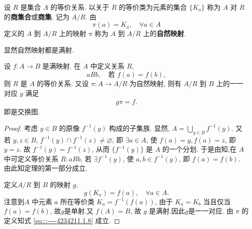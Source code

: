 \documentclass[../../main.tex]{subfiles}%
\begin{document}
\begin{definition}[商集和自然映射]
设 \( R \) 是集合 \( A \) 的等价关系. 以关于 \( R \) 的等价类为元素的集合 \( \{ K_a \} \) 称为 \( A \) 对 \( R \) 的\textbf{商集合}或\textbf{商集}. 记为 \( A/R \). 由
\[
\pi(a) = K_a,\quad \forall a \in A 
\]
定义的 \( A \) 到 \( A/R \) 上的映射 \( \pi \) 称为 \( A \) 到 \( A/R \) 上的\textbf{自然映射}.
\end{definition}
\begin{remark}
显然自然映射都是满射.
\end{remark}

\begin{theorem}\label{theorem:抽象代数--定理1.1.2}
设 \( f:A \to B \) 是满映射. 在 \( A \) 中定义关系 \( R \),
\[
aRb,\quad \text{若 } f(a) = f(b),
\]
则 \( R \) 是 \( A \) 的等价关系. 又设 \( \pi:A \to A/R \) 为自然映射, 则有 \( A/R \) 到 \( B \) 上的一一对应 \( g \) 满足
\begin{align}
g\pi = f. \label{eq:::----4234211.1.8}
\end{align}
即是交换图.
\end{theorem}
\begin{figure}[H]
\centering
\caption{}
\label{figure:交换图1}
\end{figure}
\begin{proof}
考虑 \( y \in B \) 的原像 \( f^{-1}(y) \) 构成的子集族. 显然, \( A = \bigcup_{y \in B} f^{-1}(y) \). 又若 \( y,z \in B \), \( f^{-1}(y) \cap f^{-1}(z) \neq \varnothing \), 即 \( \exists a \in A \), 使 \( f(a) = y, f(a) = z \), 即 \( y = z \). 故 \( f^{-1}(y) = f^{-1}(z) \), 从而 \( \{ f^{-1}(y) \} \) 是 \( A \) 的一个分划. 于是由知,在 \( A \) 中可定义等价关系 \( R: aRb \), 若 \( \exists f^{-1}(y) \), 使 \( a,b \in f^{-1}(y) \), 即 \( f(a) = f(b) \). 由此知定理的第一部分成立.

定义\( A/R \) 到 \( B \) 的映射 \( g \),
\[
g(K_a) = f(a),\quad \forall a \in A.
\]
注意到\( A \) 中元素 \( a \) 所在等价类 \( K_a = f^{-1}(f(a)) \), 由于 \( K_a = K_b \) 当且仅当 \( f(a) = f(b) \), 故$g$是单射.又 \( f(A) = B \), 故 \( g \) 是满射.因此$g$是一一对应. 由 \( \pi \) 的定义知式 \eqref{eq:::----4234211.1.8} 成立.
\end{proof}
\end{document}
